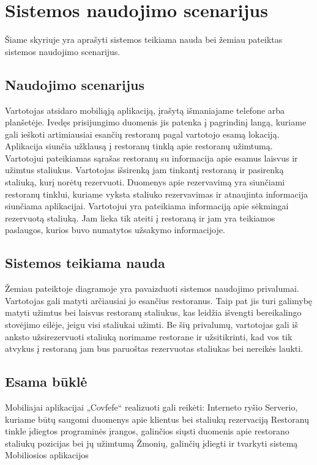 \documentclass{VUMIFPSkursinis}
\begin{document}
\section{Sistemos naudojimo scenarijus}

Šiame skyriuje yra aprašyti sistemos teikiama nauda bei žemiau pateiktas sistemos naudojimo scenarijus.

\subsection{Naudojimo scenarijus}

Vartotojas atsidaro mobiliąją aplikaciją, įrašytą išmaniajame telefone arba planšetėje. Ivedęs prisijungimo duomenis jis patenka į pagrindinį langą, kuriame gali ieškoti artimiausiai esančių restoranų pagal vartotojo esamą lokaciją. Aplikacija siunčia užklausą į restoranų tinklą apie restoranų užimtumą. Vartotojui pateikiamas sąrašas restoranų su informacija apie esamus laisvus ir užimtus staliukus. Vartotojas išsirenką jam tinkantį restoraną ir pasirenką staliuką, kurį norėtų rezervuoti. Duomenys apie rezervavimą yra siunčiami restoranų tinklui, kuriame vyksta staliuko rezervavimas ir atnaujinta informacija siunčiama aplikacijai. Vartotojui yra pateikiama informaciją apie sėkmingai rezervuotą staliuką. Jam lieka tik ateiti į restoraną ir jam yra teikiamos paslaugos, kurios buvo numatytos užsakymo informacijoje.

\subsection{Sistemos teikiama nauda}

Žemiau pateiktoje diagramoje yra pavaizduoti sistemos naudojimo privalumai.
Vartotojas gali matyti arčiausiai jo esančius restoranus. Taip pat jis turi galimybę matyti užimtus bei laisvus restoranų staliukus, kas leidžia išvengti bereikalingo stovėjimo eilėje, jeigu visi staliukai užimti. Be šių privalumų, vartotojas gali iš anksto užsirezervuoti staliuką norimame restorane ir užsitikrinti, kad vos tik atvykus į restoraną jam bus paruoštas rezervuotas staliukas bei nereikės laukti.

\subsection{Esama būklė}

Mobiliajai aplikacijai „Covfefe“ realizuoti gali reikėti:
Interneto ryšio
Serverio, kuriame būtų saugomi duomenys apie klientus bei staliukų rezervaciją
Restoranų tinkle įdiegtos programinės įrangos, galinčios siųsti duomenis apie restorano staliukų pozicijas bei jų užimtumą
Žmonių, galinčių įdiegti ir tvarkyti sistemą
Mobiliosios aplikacijos
\end{document}

